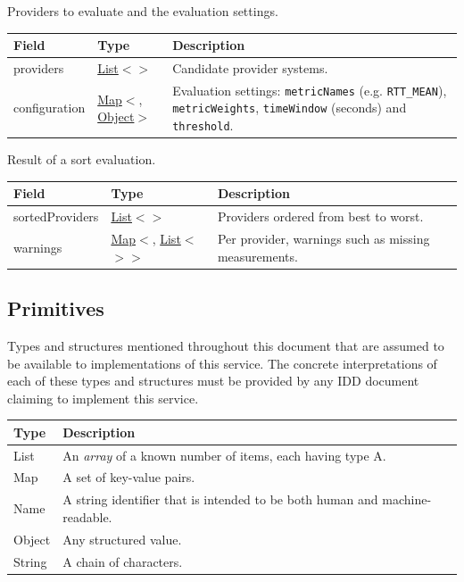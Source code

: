 \documentclass[a4paper]{arrowhead}
\newcommand{\pdef}[1]{{\textcolor{ArrowheadGrey}{#1\label{sec:model:primitives:#1}\label{sec:model:primitives:#1s}\label{sec:model:primitives:#1es}}}}
\newcommand{\pref}[1]{{\textcolor{ArrowheadGrey}{\hyperref[sec:model:primitives:#1]{#1}}}}
\begin{document}

Providers to evaluate and the evaluation settings.


\noindent\begin{tabularx}{\textwidth}{| >{\raggedright\arraybackslash}p{3.9cm} | >{\raggedright\arraybackslash\small}p{5.3cm} | X |} \hline
\rowcolor{gray!33} Field & Type & Description \\ \hline
providers & \pref{List}$<$\allowbreak{}\pref{Name}$>$ & Candidate provider systems. \\ \hline
configuration & \pref{Map}$<$\allowbreak{}\pref{String}, \pref{Object}$>$ & Evaluation settings: \texttt{metricNames} (e.g. \texttt{RTT\_\allowbreak{}MEAN}), \texttt{metricWeights}, \texttt{timeWindow} (seconds) and \texttt{threshold}. \\ \hline
\end{tabularx}




Result of a sort evaluation.


\noindent\begin{tabularx}{\textwidth}{| >{\raggedright\arraybackslash}p{3.9cm} | >{\raggedright\arraybackslash\small}p{5.3cm} | X |} \hline
\rowcolor{gray!33} Field & Type & Description \\ \hline
sorted\allowbreak{}Providers & \pref{List}$<$\allowbreak{}\pref{String}$>$ & Providers ordered from best to worst. \\ \hline
warnings & \pref{Map}$<$\allowbreak{}\pref{String}, \pref{List}$<$\allowbreak{}\pref{String}$>$$>$ & Per provider, warnings such as missing measurements. \\ \hline
\end{tabularx}



\subsection{Primitives}
\label{sec:model:primitives}

Types and structures mentioned throughout this document that are assumed to be available to implementations of this service.
The concrete interpretations of each of these types and structures must be provided by any IDD document claiming to implement this service.

\noindent\begin{tabularx}{\textwidth}{| p{4.6cm} | X |} \hline
\rowcolor{gray!33} Type & Description \\ \hline
\pdef{List} & An \textit{array} of a known number of items, each having type A. \\ \hline
\pdef{Map} & A set of key-value pairs. \\ \hline
\pdef{Name} & A string identifier that is intended to be both human and machine-readable. \\ \hline
\pdef{Object} & Any structured value. \\ \hline
\pdef{String} & A chain of characters. \\ \hline
\end{tabularx}
\end{document}
